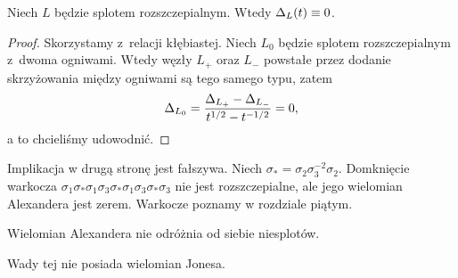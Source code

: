 \begin{proposition}
%
\label{prp:alexander_unlinks}
    Niech $L$ będzie splotem rozszczepialnym.
    Wtedy $\Delta_L(t) \equiv 0$.
\end{proposition}

\begin{proof}
    Skorzystamy z~relacji kłębiastej.
    Niech $L_0$ będzie splotem rozszczepialnym z~dwoma ogniwami.
    Wtedy węzły $L_+$ oraz $L_-$ powstałe przez dodanie skrzyżowania między ogniwami są tego samego typu, zatem
    \begin{equation}
        \Delta_{L_0} = \frac{\Delta_{L_+} - \Delta_{L_-}}{t^{1/2} - t^{-1/2}} = 0,
    \end{equation}
    a to chcieliśmy udowodnić.
\end{proof}

Implikacja w drugą stronę jest fałszywa.
Niech $\sigma_* = \sigma_{2} \sigma_{3}^{-2} \sigma_{2}$.
Domknięcie warkocza $\sigma_{1} \sigma_* \sigma_{1} \sigma_{3} \sigma_* \sigma_{1} \sigma_{3} \sigma_* \sigma_{3}$ nie jest rozszczepialne, ale jego wielomian Alexandera jest zerem.
%
Warkocze poznamy w rozdziale piątym.

\begin{corollary}
    Wielomian Alexandera nie odróżnia od siebie niesplotów.
\end{corollary}

Wady tej nie posiada wielomian Jonesa.


